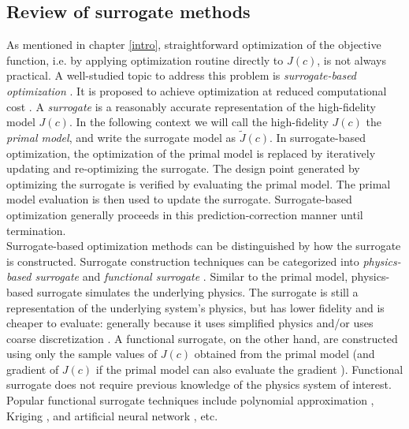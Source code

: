 \documentclass[a4paper,onecolumn]{article}
\theoremstyle{remark}
\begin{document}
\subsection{Review of surrogate methods}
\label{review surrogate methods}
\noindent As mentioned in chapter \ref{intro}, 
straightforward optimization of the objective function, i.e. by applying
optimization routine directly to $J(c)$, is not always practical.
A well-studied topic to address this problem is \emph{surrogate-based optimization}
\cite{Opt Koziel Book, Surrogate based analysis and optimization}.
It is proposed to achieve optimization at reduced computational cost \cite{Space mapping 1}.
A \emph{surrogate} is a reasonably accurate representation of the high-fidelity model $J(c)$.
In the following context we will call the high-fidelity $J(c)$ the \emph{primal model},
and write the surrogate model as $\tilde{J}(c)$.
In surrogate-based optimization, the optimization of the primal model is
replaced by iteratively updating and re-optimizing the surrogate.
The design point generated by optimizing the surrogate is verified by evaluating
the primal model. The primal model evaluation is then used to update the surrogate.
Surrogate-based optimization generally proceeds in this prediction-correction manner until
termination.\\

\noindent Surrogate-based optimization methods can be distinguished by how the surrogate is 
constructed. Surrogate construction techniques can be categorized into
\emph{physics-based surrogate} and \emph{functional surrogate} \cite{Opt Koziel Book}.
Similar to the primal model, physics-based surrogate simulates the underlying physics.
The surrogate is still a representation of the underlying system's physics, but has 
lower fidelity and is cheaper to evaluate: generally because it
uses simplified physics \cite{simplified physics, Space mapping 1} and/or
uses coarse discretization \cite{coarse discretization}.
A functional surrogate, on the other hand, are constructed using only the sample
values of $J(c)$ obtained from the primal model (and gradient of $J(c)$ if
the primal model can also evaluate the gradient \cite{gradient kriging surrogate}).
Functional surrogate does not require previous knowledge of the physics system of interest. 
Popular functional surrogate techniques include polynomial approximation 
\cite{poly functional surrogate}, Kriging \cite{kriging functional surrogate},
and artificial neural network \cite{ann functional surrogate}, etc.\\
\end{document}
